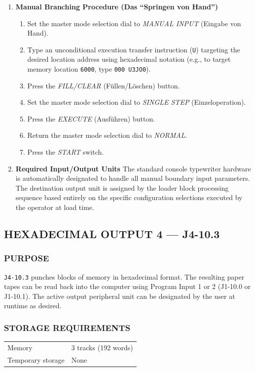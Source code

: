 \begin{enumerate}
    \item \textbf{Manual Branching Procedure (Das ``Springen von Hand'')}
    \begin{enumerate}[label=\alph*)]
        \item Set the master mode selection dial to \textit{MANUAL INPUT} (Eingabe von Hand).
        \item Type an unconditional execution transfer instruction (\texttt{U}) targeting the desired location address using hexadecimal notation (e.g., to target memory location \texttt{6000}, type \texttt{000 U3JO0}).
        \item Press the \textit{FILL/CLEAR} (Füllen/Löschen) button.
        \item Set the master mode selection dial to \textit{SINGLE STEP} (Einzeloperation).
        \item Press the \textit{EXECUTE} (Ausführen) button.
        \item Return the master mode selection dial to \textit{NORMAL}.
        \item Press the \textit{START} switch.
    \end{enumerate}

    \item \textbf{Required Input/Output Units}
    The standard console typewriter hardware is automatically designated to handle all manual boundary input parameters. The destination output unit is assigned by the loader block processing sequence based entirely on the specific configuration selections executed by the operator at load time.
\end{enumerate}



\subsection*{HEXADECIMAL OUTPUT 4 --- J4-10.3}
\label{sec:hexadecimal-output-4}

\subsubsection*{PURPOSE}
\texttt{J4-10.3} punches blocks of memory in hexadecimal format. The resulting paper tapes can be read back into the computer using Program Input 1 or 2 (J1-10.0 or J1-10.1). The active output peripheral unit can be designated by the user at runtime as desired.

\subsubsection*{STORAGE REQUIREMENTS}
\begin{center}
\begin{tabular}{ll}
    \toprule
    Memory & 3 tracks (192 words) \\
    Temporary storage    & None \\
    \bottomrule
\end{tabular}
\end{center}

